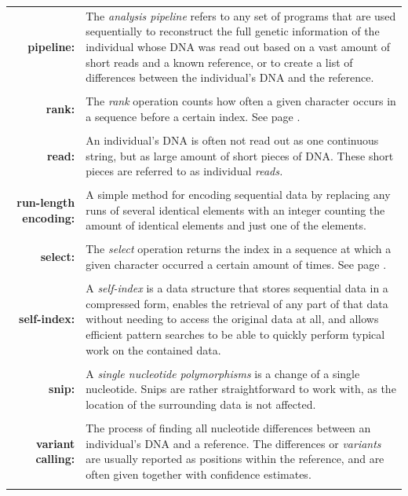 \documentclass[a4paper,12pt,twoside,BCOR=10mm]{scrbook}
\begin{document}
\begin{tabular}{r p{12cm}}

\textbf{pipeline: } & 
The \textit{analysis pipeline} refers to any set of programs 
that are used sequentially to reconstruct the full genetic information 
of the individual whose DNA was read out based on a vast amount of short reads and a 
known reference, or to create a list of differences between the individual's DNA 
and the reference.
\\ \\

\textbf{rank: } & The \textit{rank} operation counts how often a given character occurs 
in a sequence before a certain index. See page \pageref{def:rank}.
\\ \\

\textbf{read: } & 
An individual's DNA is often not read out as one continuous string, 
but as large amount of short pieces of DNA. 
These short pieces are referred to as individual \textit{reads.}
\\ \\

\textbf{run-length encoding:} &
A simple method for encoding sequential data by replacing any runs of several 
identical elements with an integer counting the amount of identical elements and 
just one of the elements.
\\ \\

\textbf{select: } & The \textit{select} operation returns the index in a sequence 
at which a given character occurred a certain amount of times. See page \pageref{def:select}.
\\ \\

\textbf{self-index:} & 
A \textit{self-index} is a data structure that 
stores sequential data in a compressed form, enables the retrieval of any part of that data without needing 
to access the original data at all, 
and allows efficient pattern searches to be able to quickly perform typical work on the contained data.
\\ \\

\textbf{snip:} &
A \textit{single nucleotide polymorphisms} is a change of a single nucleotide. 
Snips are rather straightforward to work with, as the location of the surrounding data is not affected.
\\ \\

\textbf{variant calling:} & 
The process of finding all nucleotide differences 
between an individual's DNA and a reference. The differences or \textit{variants} are usually reported as positions 
within the reference, and are often given together with confidence estimates.
\\ \\

\end{tabular}
\end{document}
